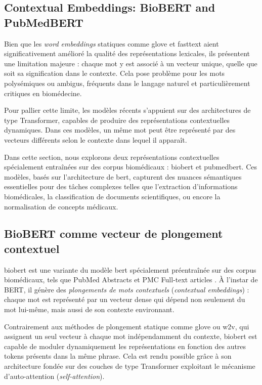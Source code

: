 \documentclass[12pt]{report}
\begin{document}
\subsection{Contextual Embeddings: BioBERT and PubMedBERT}

Bien que les \textit{word embeddings} statiques comme \gls{glove} et \gls{fasttext} aient significativement amélioré la qualité des représentations lexicales, ils présentent une limitation majeure : chaque mot y est associé à un vecteur unique, quelle que soit sa signification dans le contexte. Cela pose problème pour les mots polysémiques ou ambigus, fréquents dans le langage naturel et particulièrement critiques en biomédecine.

Pour pallier cette limite, les modèles récents s'appuient sur des architectures de type Transformer, capables de produire des représentations contextuelles dynamiques. Dans ces modèles, un même mot peut être représenté par des vecteurs différents selon le contexte dans lequel il apparaît.

Dans cette section, nous explorons deux représentations contextuelles spécialement entraînées sur des corpus biomédicaux : \gls{biobert} et \gls{pubmedbert}. Ces modèles, basés sur l’architecture de \gls{bert}, capturent des nuances sémantiques essentielles pour des tâches complexes telles que l’extraction d’informations biomédicales, la classification de documents scientifiques, ou encore la normalisation de concepts médicaux.

\subsection{BioBERT comme vecteur de plongement contextuel}

\gls{biobert} est une variante du modèle \gls{bert} spécialement préentraînée sur des corpus biomédicaux, tels que PubMed Abstracts et PMC Full-text articles \cite{lee2020biobert}. À l’instar de BERT, il génère des \textit{plongements de mots contextuels} (\textit{contextual embeddings}) : chaque mot est représenté par un vecteur dense qui dépend non seulement du mot lui-même, mais aussi de son contexte environnant.

Contrairement aux méthodes de plongement statique comme \gls{glove} ou \gls{w2v}, qui assignent un seul vecteur à chaque mot indépendamment du contexte, \gls{biobert} est capable de moduler dynamiquement les représentations en fonction des autres tokens présents dans la même phrase. Cela est rendu possible grâce à son architecture fondée sur des couches de type Transformer exploitant le mécanisme d’auto-attention (\textit{self-attention}).
\end{document}

